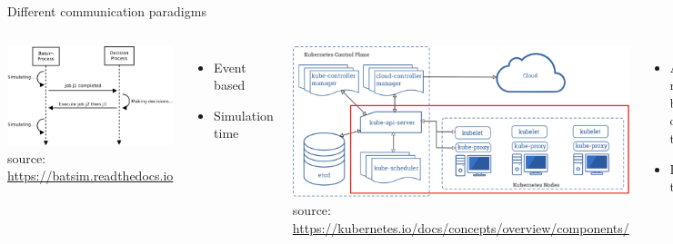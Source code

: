 \documentclass[12pt, aspectratio=43]{beamer}
\begin{document}
\begin{frame}{Different communication paradigms}
	\begin{columns}
		\centering
		\includegraphics[width=\textwidth]{../imgs/case1_protocol.png}
		{\tiny source: \url{https://batsim.readthedocs.io}}
		\begin{itemize}
			\item Event based
			\item Simulation time
		\end{itemize}

		\includegraphics[width=\textwidth]{../imgs/kubernetes-components.pdf}
		{\tiny source: \url{https://kubernetes.io/docs/concepts/overview/components/}}
		\begin{itemize}
			\item API requests based on timers
			\item Real time
		\end{itemize}
	\end{columns}
\end{frame}
\end{document}
